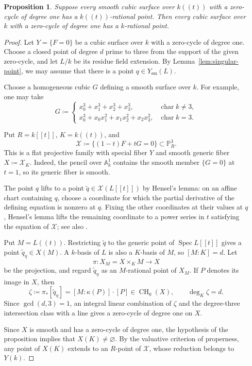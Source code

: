 \documentclass[a4paper,11pt]{amsart}
\numberwithin{equation}{section}
\newtheorem{proposition}[theorem]{Proposition}
\theoremstyle{definition}
\theoremstyle{remark}
\newcommand{\PP}{\mathbb P}
\newcommand{\A}{\mathbb A}
\newcommand{\CH}{\operatorname{CH}}
\newcommand{\Aff}{\A}
\begin{document}
\begin{proposition}
\label{prop:smoothing}
Suppose every smooth cubic surface over $k((t))$ with a zero-cycle of
degree one has a $k((t))$-rational point. Then every cubic surface over
$k$ with a zero-cycle of degree one has a $k$-rational point.
\end{proposition}
\begin{proof}
Let $Y=\{F=0\}$ be a cubic surface over $k$ with a zero-cycle of degree one.
Choose a closed point of degree $d$ prime to three from the support of
the given zero-cycle, and let $L/k$ be its residue field extension.
By Lemma~\ref{lem:singular-point}, we may assume that there is a point
$q\in Y_{\mathrm{sm}}(L)$.

Choose a homogeneous cubic $G$ defining a smooth surface over $k$.
For example, one may take
\[
 G\coloneq
 \begin{cases}
 x_0^3+x_1^3+x_2^3+x_3^3,
     &\operatorname{char}k\ne3,\\
 x_0^3+x_0x_1^2+x_1x_2^2+x_2x_3^2,
     &\operatorname{char}k=3.
 \end{cases}
\]

Put $R=k[[t]]$, $K=k((t))$, and
\[
 \mathscr X\coloneq
 \{(1-t)F+tG=0\}\subset\PP^3_R.
\]
This is a flat projective family with special fiber $Y$ and smooth
generic fiber $X\coloneq\mathscr X_K$. Indeed, the pencil over
$\Aff^1_k$ contains the smooth member $\{G=0\}$ at $t=1$, so its
generic fiber is smooth.

The point $q$ lifts to a point
$\tilde q\in\mathscr X(L[[t]])$ by Hensel's lemma: on an affine chart
containing $q$, choose a coordinate for which the partial derivative
of the defining equation is nonzero at $q$. Fixing the other
coordinates at their values at $q$, Hensel's lemma lifts the remaining
coordinate to a power series in $t$ satisfying the equation of
$\mathscr X$; see also \cite[Lemma~2.4]{ma}.

Put $M=L((t))$. Restricting $\tilde q$ to the generic point of
$\operatorname{Spec}L[[t]]$ gives a point $\tilde q_\eta\in X(M)$.
A $k$-basis of $L$ is also a $K$-basis of $M$, so $[M:K]=d$.
Let
\[
 \pi\colon X_M=X\times_K M\longrightarrow X
\]
be the projection, and regard $\tilde q_\eta$ as an $M$-rational
point of $X_M$. If $P$ denotes its image in $X$, then
\[
 \zeta\coloneq\pi_*[\tilde q_\eta]
   =[M:\kappa(P)]\cdot[P]\in\CH_0(X),
 \qquad \deg_K\zeta=d.
\]
Since $\gcd(d,3)=1$, an integral linear combination of $\zeta$ and
the degree-three intersection class with a line gives a zero-cycle
of degree one on $X$.

Since $X$ is smooth and has a zero-cycle of degree one, the hypothesis
of the proposition implies that $X(K)\ne\varnothing$.
By the valuative criterion of properness, any point of $X(K)$ extends
to an $R$-point of $\mathscr X$, whose reduction belongs to $Y(k)$.
\end{proof}
  
\end{document}
